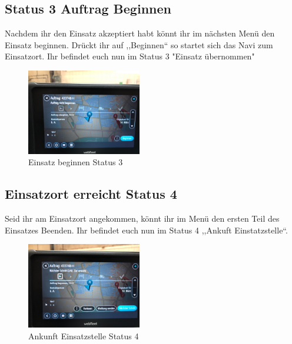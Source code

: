 \documentclass[a4paper,12pt]{scrartcl}
\begin{document}
    \subsection{Status 3 Auftrag Beginnen}
    Nachdem ihr den Einsatz akzeptiert habt könnt ihr im nächsten Menü den Einsatz beginnen. Drückt ihr auf ,,Beginnen``
    so startet sich das Navi zum Einsatzort. Ihr befindet euch nun im Status 3 "Einsatz übernommen"
    \begin{figure}[h]
        \begin{center}
            \includegraphics[width=5cm]{bilder/beginnen.jpg}
            \caption{Einsatz beginnen Status 3}
            \label{beginnen}
        \end{center}     
    \end{figure}
    
    \newpage
    \subsection{Einsatzort erreicht Status 4}
    Seid ihr am Einsatzort angekommen, könnt ihr im Menü den ersten Teil des Einsatzes Beenden. Ihr befindet euch nun im Status 4 ,,Ankuft Einstatzstelle``.
    
    \begin{figure}[h]
        \begin{center}
            \includegraphics[width=5cm]{bilder/einsatzort.jpg}
            \caption{Ankunft Einsatzstelle Status 4}
            \label{ankunft Einsatzstelle}
        \end{center} 
    \end{figure}
    
\end{document}
